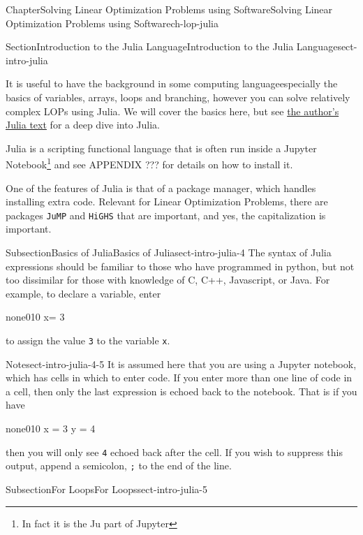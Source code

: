 \documentclass[oneside,10pt,]{book}
\newcommand{\mono}[1]{\texttt{#1}}
\numberwithin{equation}{section}
\begin{document}
\begin{chapterptx}{Chapter}{Solving Linear Optimization Problems using Software}{}{Solving Linear Optimization Problems using Software}{}{}{ch-lop-julia}
\begin{sectionptx}{Section}{Introduction to the Julia Language}{}{Introduction to the Julia Language}{}{}{sect-intro-julia}
\begin{introduction}{}
\par
It is useful to have the background in some computing language\textemdash{}especially the basics of variables, arrays, loops and branching, however you can solve relatively complex LOPs using Julia. We will cover the basics here, but see \href{}{the author's Julia text} for a deep dive into Julia.%
\par
Julia is a scripting functional language that is often run inside a Jupyter Notebook\footnote{In fact it is the Ju part of Jupyter\label{sect-intro-julia-3-3-1}} and see APPENDIX ??? for details on how to install it.%
\par
One of the features of Julia is that of a package manager, which handles installing extra code. Relevant for Linear Optimization Problems, there are packages \mono{JuMP} and \mono{HiGHS} that are important, and yes, the capitalization is important.%
\end{introduction}%
%
%
\typeout{************************************************}
\typeout{************************************************}
%
\begin{subsectionptx}{Subsection}{Basics of Julia}{}{Basics of Julia}{}{}{sect-intro-julia-4}
The syntax of Julia expressions should be familiar to those who have programmed in python, but not too dissimilar for those with knowledge of C, C++, Javascript, or Java. For example, to declare a variable, enter%
\begin{program}{none}{0}{1}{0}
x= 3
\end{program}
to assign the value \mono{3} to the variable \mono{x}.%
\begin{note}{Note}{}{sect-intro-julia-4-5}%
It is assumed here that you are using a Jupyter notebook, which has cells in which to enter code. If you enter more than one line of code in a cell, then only the last expression is echoed back to the notebook. That is if you have%
\begin{program}{none}{0}{1}{0}
x = 3
y = 4
\end{program}
then you will only see \mono{4} echoed back after the cell. If you wish to suppress this output, append a semicolon, \mono{;} to the end of the line.%
\end{note}
\end{subsectionptx}
%
%
\typeout{************************************************}
\typeout{************************************************}
%
\begin{subsectionptx}{Subsection}{For Loops}{}{For Loops}{}{}{sect-intro-julia-5}

\end{subsectionptx}
\end{sectionptx}
\end{chapterptx}
\end{document}
